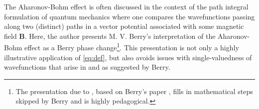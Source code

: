 \documentclass[reprint,
nofootinbib,
amsmath,amssymb,
aps]{revtex4-1}
\begin{document}
The Aharonov-Bohm effect is often discussed in the context of the path integral formulation of quantum mechanics where one compares the wavefunctions passing along two (distinct) paths in a vector potential associated with some magnetic field $\bm{B}$.  Here, the author presents M. V. Berry's interpretation of the Aharonov-Bohm effect as a Berry phase change\footnote{The presentation due to \cite{griffiths2018introduction}, based on Berry's paper \cite{berry1984quantal}, fills in mathematical steps skipped by Berry and is highly pedagogical.}. This presentation is not only a highly illustrative application of \eqref{eq:def}, but also avoids issues with single-valuedness of wavefunctions that arise in \cite{aharonov1959significance} and \cite{ehrenberg1949refractive} as suggested by Berry. 



\end{document}
